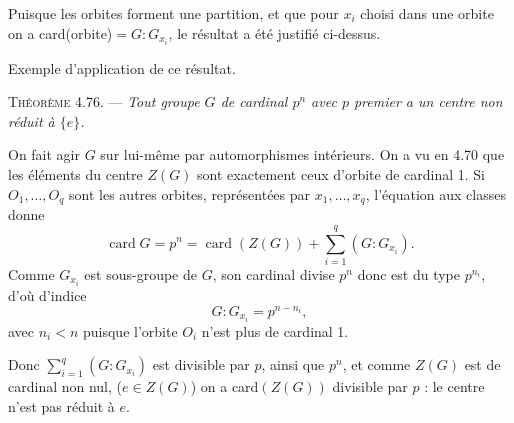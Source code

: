 Puisque les orbites forment une partition, et que pour $x_i$ choisi dans une orbite on a card(orbite)$=G:G_{x_i}$, le résultat a été justifié ci-dessus. \bookend

Exemple d'application de ce résultat.

\medskip\noindent\textsc{Théorème 4.76.} --- \emph{Tout groupe $G$ de cardinal $p^n$ avec $p$ premier a un centre non réduit à $\{e\}$.}

On fait agir $G$ sur lui-même par automorphismes intérieurs. On a vu en 4.70 que les éléments du centre $Z(G)$ sont exactement ceux d'orbite de cardinal 1. Si $O_1,\ldots,O_q$ sont les autres orbites, représentées par $x_1,\ldots,x_q$, l'équation aux classes donne
\[
\operatorname{card}G=p^n=\operatorname{card}(Z(G))+\sum_{i=1}^{q}(G:G_{x_i}).
\]
Comme $G_{x_i}$ est sous-groupe de $G$, son cardinal divise $p^n$ donc est du type $p^{n_i}$, d'où d'indice
\[
G:G_{x_i}=p^{n-n_i},
\]
avec $n_i<n$ puisque l'orbite $O_i$ n'est plus de cardinal 1.

Donc $\sum_{i=1}^{q}(G:G_{x_i})$ est divisible par $p$, ainsi que $p^n$, et comme $Z(G)$ est de cardinal non nul, ($e\in Z(G)$) on a card$(Z(G))$ divisible par $p$ : le centre n'est pas réduit à $e$. \bookend



